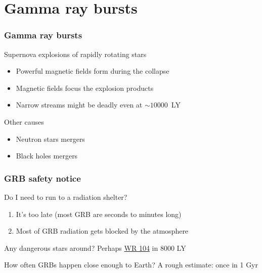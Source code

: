 \documentclass{beamer}
\begin{document}
\section{Gamma ray bursts}
\begin{frame}
\frametitle{Gamma ray bursts}
\begin{block}{Supernova explosions of rapidly rotating stars}
\begin{itemize}
\item Powerful magnetic fields form during the collapse
\item Magnetic fields focus the explosion products
\item Narrow streams might be deadly even at $\sim 10000$~LY
\end{itemize}
\end{block}
\begin{block}{Other causes}
\begin{itemize}
\item Neutron stars mergers
\item Black holes mergers
\end{itemize}
\end{block}
\end{frame}

\begin{frame}
\frametitle{GRB safety notice}

\begin{block}{Do I need to run to a radiation shelter?}
\begin{enumerate}
\item It's too late (most GRB are seconds to minutes long)
\item Most of GRB radiation gets blocked by the atmosphere
\end{enumerate}
\end{block}

\begin{block}{Any dangerous stars around?}
Perhaps \href{https://en.wikipedia.org/wiki/WR_104}{WR 104} in 8000 LY
\end{block}

\begin{block}{How often GRBs happen close enough to Earth?}
A rough estimate: once in 1 Gyr
\end{block}
\end{frame}
\end{document}
